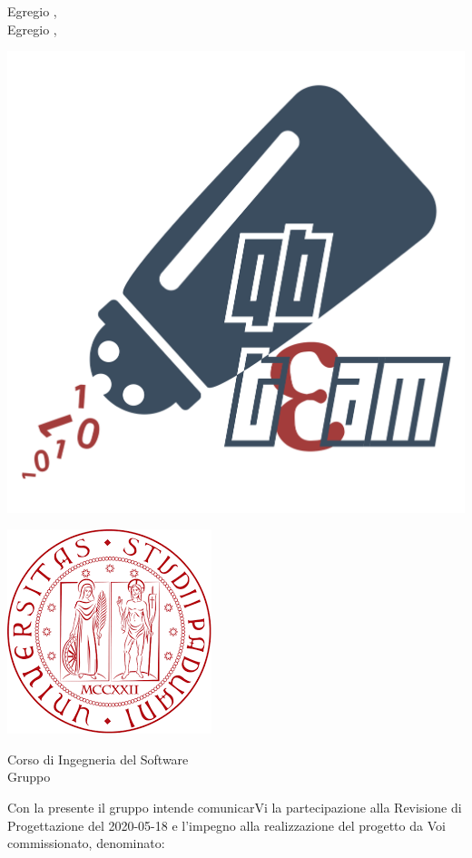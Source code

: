 \documentclass[12pt]{letter}
\begin{document}
    \begin{letter}
        { Egregio \VT{},\\Egregio \CR{},}
        \begin{minipage}{.4\textwidth}
            \begin{flushleft}
                \includegraphics[width=.4\linewidth]{../Utilita/Immagini/qbteam.png}
            \end{flushleft}
        \end{minipage}
        \begin{minipage}{.5\textwidth}
            \begin{flushright}
                \includegraphics[width=.4\linewidth]{../Utilita/Immagini/LogoUniPD.png}
            \end{flushright}
        \end{minipage}
        {    
        \begin{flushleft}
            Corso di Ingegneria del Software\\ Gruppo \Gruppo{}\\ 
        \end{flushleft}
        }
        \opening{ Con la presente il gruppo \Gruppo{} intende comunicarVi la partecipazione alla Revisione di Progettazione del 2020-05-18 e l'impegno alla realizzazione del progetto da Voi commissionato, denominato:}
        \begin{center}
           \textbf{\NomeProgetto{}} 
        \end{center}

\end{letter}
\end{document}
